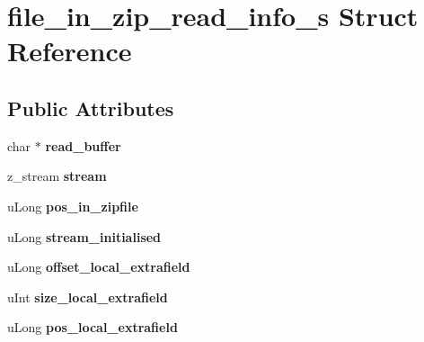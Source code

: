 \hypertarget{structfile__in__zip__read__info__s}{\section{file\-\_\-in\-\_\-zip\-\_\-read\-\_\-info\-\_\-s Struct Reference}
\label{structfile__in__zip__read__info__s}
}
\subsection*{Public Attributes}
\begin{DoxyCompactItemize}
\item 
\hypertarget{structfile__in__zip__read__info__s_a6310a19e33ac2cf3280aa74199cbd89b}{char $\ast$ {\bfseries read\-\_\-buffer}}\label{structfile__in__zip__read__info__s_a6310a19e33ac2cf3280aa74199cbd89b}

\item 
\hypertarget{structfile__in__zip__read__info__s_a6973c6240c02a1c8e014d6078bb2bbfc}{z\-\_\-stream {\bfseries stream}}\label{structfile__in__zip__read__info__s_a6973c6240c02a1c8e014d6078bb2bbfc}

\item 
\hypertarget{structfile__in__zip__read__info__s_a01d6195d7977bec4db506cdbee9b8a13}{u\-Long {\bfseries pos\-\_\-in\-\_\-zipfile}}\label{structfile__in__zip__read__info__s_a01d6195d7977bec4db506cdbee9b8a13}

\item 
\hypertarget{structfile__in__zip__read__info__s_a8f2d03c24a7b1058288606687eb6d448}{u\-Long {\bfseries stream\-\_\-initialised}}\label{structfile__in__zip__read__info__s_a8f2d03c24a7b1058288606687eb6d448}

\item 
\hypertarget{structfile__in__zip__read__info__s_a8e3a240c367e7d6d199859b1b311128c}{u\-Long {\bfseries offset\-\_\-local\-\_\-extrafield}}\label{structfile__in__zip__read__info__s_a8e3a240c367e7d6d199859b1b311128c}

\item 
\hypertarget{structfile__in__zip__read__info__s_a9abdc9b3f3d500d894a635cc9e956180}{u\-Int {\bfseries size\-\_\-local\-\_\-extrafield}}\label{structfile__in__zip__read__info__s_a9abdc9b3f3d500d894a635cc9e956180}

\item 
\hypertarget{structfile__in__zip__read__info__s_aa07cf3d7d5d68e9537ffe99499d7db6f}{u\-Long {\bfseries pos\-\_\-local\-\_\-extrafield}}\label{structfile__in__zip__read__info__s_aa07cf3d7d5d68e9537ffe99499d7db6f}


\end{DoxyCompactItemize}
